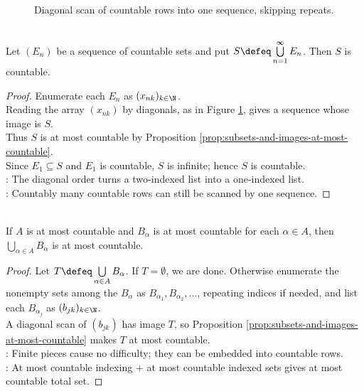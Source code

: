\begin{figure}[H]
  \centering
  
  \caption{Diagonal scan of countable rows into one sequence, skipping repeats.}
  \label{fig:countable-union-diagonal-scan}
\end{figure}

\begin{theorem} \label{thm:countable-union-of-countable-sets}\label{thm:cardinality-main-results-source-todo} \\
Let $(E_n)$ be a sequence of countable sets and put $S\defeq\bigcup\limits_{n=1}^{\infty}E_n$. Then $S$ is countable.
\begin{proof}
Enumerate each $E_n$ as $(x_{nk})_{k\in\N}$.\\
Reading the array $(x_{nk})$ by diagonals, as in Figure \ref{fig:countable-union-diagonal-scan}, gives a sequence whose image is $S$.\\
Thus $S$ is at most countable by Proposition \ref{prop:subsets-and-images-at-most-countable}.\\
Since $E_1\subseteq S$ and $E_1$ is countable, $S$ is infinite; hence $S$ is countable.\\
: The diagonal order turns a two-indexed list into a one-indexed list.\\
: Countably many countable rows can still be scanned by one sequence.
\end{proof}
\end{theorem}

\begin{corollary} \label{cor:at-most-countable-union-at-most-countable} \\
If $A$ is at most countable and $B_\alpha$ is at most countable for each $\alpha\in A$, then $\bigcup\limits_{\alpha\in A}B_\alpha$ is at most countable.
\begin{proof}
Let $T\defeq\bigcup\limits_{\alpha\in A}B_\alpha$. If $T=\emptyset$, we are done. Otherwise enumerate the nonempty sets among the $B_\alpha$ as $B_{\alpha_1},B_{\alpha_2},\ldots$, repeating indices if needed, and list each $B_{\alpha_j}$ as $(b_{jk})_{k\in\N}$.\\
A diagonal scan of $(b_{jk})$ has image $T$, so Proposition \ref{prop:subsets-and-images-at-most-countable} makes $T$ at most countable.\\
: Finite pieces cause no difficulty; they can be embedded into countable rows.\\
: At most countable indexing $+$ at most countable indexed sets gives at most countable total set.
\end{proof}
\end{corollary}

